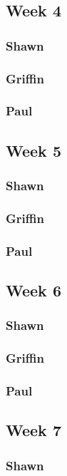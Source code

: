 \documentclass[10pt,draftclsnofoot,onecolumn]{IEEEtran}
\begin{document}
\subsection{Week 4}
\subsubsection{Shawn}
\subsubsection{Griffin}
\subsubsection{Paul}

\subsection{Week 5}
\subsubsection{Shawn}
\subsubsection{Griffin}
\subsubsection{Paul}

\subsection{Week 6}
\subsubsection{Shawn}
\subsubsection{Griffin}
\subsubsection{Paul}

\subsection{Week 7}
\subsubsection{Shawn}
\end{document}
